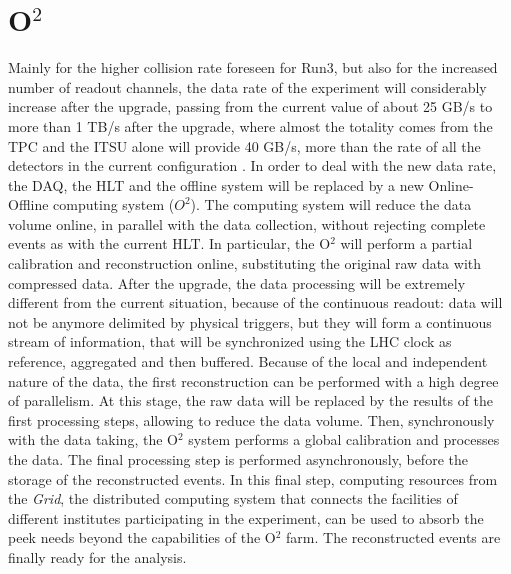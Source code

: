\section{O$^2$}
Mainly for the higher collision rate foreseen for Run3, but also for the increased number of readout channels, the data rate of the experiment will considerably increase after the upgrade, passing from the current value of about 25 GB/s to more than 1 TB/s after the upgrade, where almost the totality comes from the TPC and the ITSU alone will provide 40 GB/s, more than the rate of all the detectors in the current configuration \cite{o2}. In order to deal with the new data rate, the DAQ, the HLT and the offline system will be replaced by a new Online-Offline computing system ($O^2$). The computing system will reduce the data volume online, in parallel with the data collection, without rejecting complete events as with the current HLT. In particular, the O$^2$ will perform a partial calibration and reconstruction online, substituting the original raw data with compressed data.
After the upgrade, the data processing will be extremely different from the current situation, because of the continuous readout: data will not be anymore delimited by physical triggers, but they will form a continuous stream of information, that will be synchronized using the LHC clock as reference, aggregated and then buffered. Because of the local and independent nature of the data, the first reconstruction can be performed with a high degree of parallelism. At this stage, the raw data will be replaced by the results of the first processing steps, allowing to reduce the data volume. Then, synchronously with the data taking, the O$^2$ system performs a global calibration and processes the data. The final processing step is performed asynchronously, before the storage of the reconstructed events. In this final step, computing resources from the \textit{Grid}, the distributed computing system that connects the facilities of different institutes participating in the experiment, can be used to absorb the peek needs beyond the capabilities of the O$^2$ farm. The reconstructed events are finally ready for the analysis.
